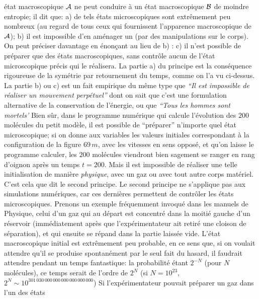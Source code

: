 \'etat macroscopique ${\cal A}$ ne peut conduire \`a un \'etat macroscopique 
${\cal B}$ de moindre entropie; il dit que:
\smallskip
a) de tels \'etats microscopiques sont extr\^emement peu nombreux (au 
regard de tous ceux qui fournissent l'apparence macroscopique de ${\cal A}$);
\smallskip
b) il est impossible d'en am\'enager un (par des manipulations sur le corps).
\medskip
On peut pr\'eciser davantage en \'enon\c{c}ant au lieu de b) :
\smallskip
c) il n'est possible de pr\'eparer que des \'etats macroscopiques, sans 
contr\^ole aucun de l'\'etat microscopique pr\'ecis qui le r\'ealisera.
\medskip
La partie a) du principe est la cons\'equence rigoureuse de la sym\'etrie 
par retournement du temps, comme on l'a vu ci-dessus. La partie 
b) ou c) est un fait empirique du m\^eme type que 
\smallskip
{\sl
``Il est impossible de r\'ealiser un mouvement perp\'etuel''}
\medskip
\noindent dont on sait que c'est une formulation alternative de la 
conservation de l'\'energie, ou que
\smallskip
{\sl ``Tous les hommes sont mortels'}
\medskip
Bien s\^ur, dans le programme num\'erique qui calcule l'\'evolution des 
$200$ mol\'ecules du petit mod\`ele, il est possible de ``pr\'eparer''
n'importe quel \'etat microscopique; si on donne aux variables les 
valeurs initiales correspondant \`a la configuration de la figure $69\, m$, 
avec les vitesses en sens oppos\'e, et qu'on laisse le programme calculer, 
les $200$ mol\'ecules viendront bien sagement se ranger en rang d'oignon 
apr\`es un temps $t=200$. Mais il est impossible de r\'ealiser une 
telle initialisation de mani\`ere {\it physique}, avec un gaz ou 
avec tout autre corps mat\'eriel. C'est cela 
que dit le second principe. Le second principe ne s'applique pas 
aux simulations num\'eriques, car ces derni\`eres permettent de 
contr\^oler les \'etats microscopiques. 
\medskip 
Prenons un exemple fr\'equemment invoqu\'e dans les manuels de Physique, 
celui d'un gaz qui au d\'epart est concentr\'e dans la moiti\'e gauche d'un 
r\'eservoir (imm\'ediatement apr\`es que l'exp\'erimentateur ait retir\'e 
une cloison de s\'eparation), et qui ensuite se r\'epand dans la 
partie laiss\'ee vide. L'\'etat macroscopique 
initial est extr\^emement peu probable, en ce sens que, si on voulait 
attendre qu'il se produise spontan\'ement par le seul fait du hasard, 
il faudrait attendre pendant un temps fantastique: la probabilit\'e \'etant 
$2^{-N}$ (pour $N$ mol\'ecules), ce temps serait de l'ordre de $2^{N}$ (si 
$N = 10^{23}$, $2^N \sim 10^{301\, 030\, 000\, 000\, 000\, 000\, 000\, 000}$)
Si l'exp\'erimentateur pouvait pr\'eparer un gaz dans l'un des \'etats 
